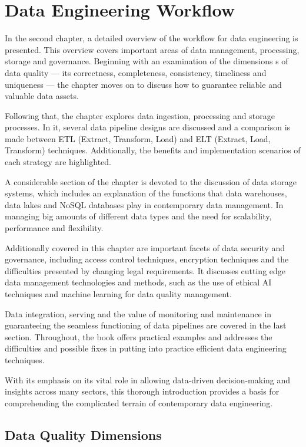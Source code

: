 \chapter{Data Engineering Workflow}

In the second chapter, a detailed overview of the workflow for data engineering is presented. This overview covers important areas of data management, processing, storage and governance. Beginning with an examination of the dimensions s of data quality — its correctness, completeness, consistency, timeliness and uniqueness — the chapter moves on to discuss how to guarantee reliable and valuable data assets.

Following that, the chapter explores data ingestion, processing and storage processes. In it, several data pipeline designs are discussed and a comparison is made between ETL (Extract, Transform, Load) and ELT (Extract, Load, Transform) techniques. Additionally, the benefits and implementation scenarios of each strategy are highlighted.

A considerable section of the chapter is devoted to the discussion of data storage systems, which includes an explanation of the functions that data warehouses, data lakes and NoSQL databases play in contemporary data management. In managing big amounts of different data types and the need for scalability, performance and flexibility.

Additionally covered in this chapter are important facets of data security and governance, including access control techniques, encryption techniques and the difficulties presented by changing legal requirements. It discusses cutting edge data management technologies and methods, such as the use of ethical AI techniques and machine learning for data quality management.

Data integration, serving and the value of monitoring and maintenance in guaranteeing the seamless functioning of data pipelines are covered in the last section. Throughout, the book offers practical examples and addresses the difficulties and possible fixes in putting into practice efficient data engineering techniques.

With its emphasis on its vital role in allowing data-driven decision-making and insights across many sectors, this thorough introduction provides a basis for comprehending the complicated terrain of contemporary data engineering.

\section{Data Quality Dimensions}

